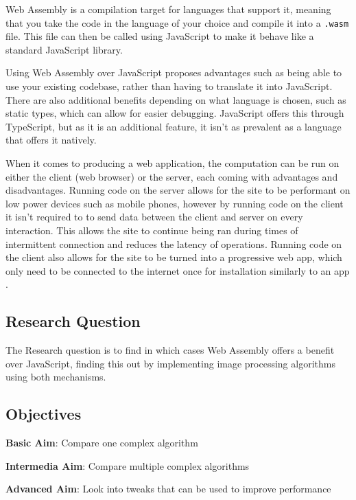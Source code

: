 \documentclass[12pt,a4paper]{article}
\begin{document}
Web Assembly is a compilation target for languages that support it, meaning that you take the code in the language of your choice and compile it into a \texttt{.wasm} file. This file can then be called using JavaScript to make it behave like a standard JavaScript library.


Using Web Assembly over JavaScript proposes advantages such as being able to use your existing codebase, rather than having to translate it into JavaScript. There are also additional benefits depending on what language is chosen, such as static types, which can allow for easier debugging. JavaScript offers this through TypeScript, but as it is an additional feature, it isn't as prevalent as a language that offers it natively.

When it comes to producing a web application, the computation can be run on either the client (web browser) or the server, each coming with advantages and disadvantages. Running code on the server allows for the site to be performant on low power devices such as mobile phones, however by running code on the client it isn't required to to send data between the client and server on every interaction. This allows the site to continue being ran during times of intermittent connection and reduces the latency of operations. Running code on the client also allows for the site to be turned into a progressive web app, which only need to be connected to the internet once for installation similarly to an app \cite{biorn2017progressive}.


\subsection{Research Question}

The Research question is to find in which cases Web Assembly offers a benefit over JavaScript, finding this out by implementing image processing algorithms using both mechanisms.

\subsection{Objectives}

\textbf{Basic Aim}: Compare one complex algorithm

\textbf{Intermedia Aim}: Compare multiple complex algorithms

\textbf{Advanced Aim}: Look into tweaks that can be used to improve performance
\end{document}
